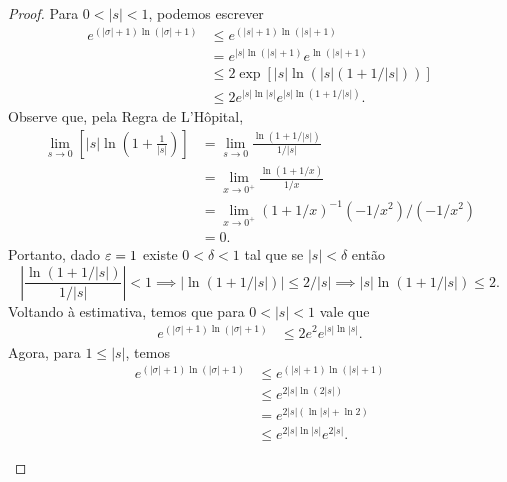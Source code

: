 \begin{proof}
        Para $0 < |s| < 1$, podemos escrever
        \begin{align*}
            e^{(|\sigma|+1)\ln(|\sigma|+1)} &\leq e^{(|s|+1)\ln(|s|+1)} \\
                                            &= e^{|s|\ln(|s|+1)}e^{\ln(|s|+1)} \\
                                            &\leq 2\exp\left[ |s|\ln\left( |s|(1 + 1/|s|) \right) \right] \\
                                            &\leq 2e^{|s|\ln|s|}e^{|s|\ln(1 + 1/|s|)}.
        \end{align*}
        Observe que, pela Regra de L'Hôpital,
        \begin{align*}
            \lim_{s\to 0} \left[ |s|\ln\left( 1 + \frac{1}{|s|} \right) \right]
            &= \lim_{s\to 0} \frac{\ln(1 + 1/|s|)}{1/|s|} \\
            &= \lim_{x\to 0^+} \frac{\ln(1 + 1/x)}{1/x} \\
            &= \lim_{x\to 0^+} (1 + 1/x)^{-1}(-1/x^2)/(-1/x^2) \\
            &= 0.
        \end{align*}
        Portanto, dado $\varepsilon=1$ existe $0<\delta<1$ tal que se $|s|<\delta$ então
        \[
        \left| \frac{\ln(1 + 1/|s|)}{1/|s|} \right| < 1 \implies |\ln(1 + 1/|s|)| \leq 2/|s| 
                                                        \implies |s|\ln(1+1/|s|) \leq 2.
        \]
        Voltando à estimativa, temos que para $0<|s|<1$ vale que
        \begin{align*}
            e^{(|\sigma|+1)\ln(|\sigma|+1)} &\leq 2e^2e^{|s|\ln|s|}.
        \end{align*}
        Agora, para $1\leq|s|$, temos
        \begin{align*}
            e^{(|\sigma|+1)\ln(|\sigma|+1)} &\leq e^{(|s|+1)\ln(|s|+1)} \\
                                            &\leq e^{2|s|\ln(2|s|)} \\
                                            &= e^{2|s|(\ln|s| + \ln 2)} \\
                                            &\leq e^{2|s|\ln|s|}e^{2|s|}.
        \end{align*}
        \begin{center}
        \end{center}

\end{proof}
